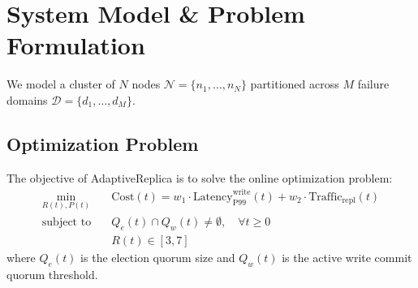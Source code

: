 \section{System Model & Problem Formulation}
\label{sec:system_model}

We model a cluster of $N$ nodes $\mathcal{N} = \{n_1, \dots, n_N\}$ partitioned across $M$ failure domains $\mathcal{D} = \{d_1, \dots, d_M\}$.

\subsection{Optimization Problem}
The objective of AdaptiveReplica is to solve the online optimization problem:
\begin{align}
    \min_{R(t), P(t)} \quad &\text{Cost}(t) = w_1 \cdot \text{Latency}_{\text{P99}}^{\text{write}}(t) + w_2 \cdot \text{Traffic}_{\text{repl}}(t) \\
    \text{subject to} \quad &Q_e(t) \cap Q_w(t) \neq \emptyset, \quad \forall t \ge 0 \\
    &R(t) \in [3, 7]
\end{align}
where $Q_e(t)$ is the election quorum size and $Q_w(t)$ is the active write commit quorum threshold.
